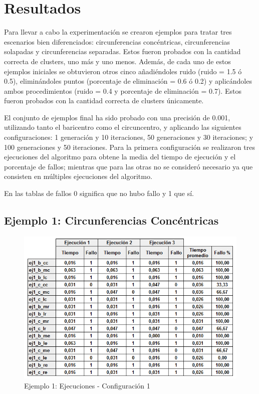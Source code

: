 \documentclass[conference,a4paper]{IEEEtran}
\begin{document}
\section{Resultados}

Para llevar a cabo la experimentación se crearon ejemplos para tratar tres escenarios bien diferenciados: circunferencias concéntricas, circunferencias solapadas y circunferencias separadas. Estos fueron probados con la cantidad correcta de clusters, uno más y uno menos. Además, de cada uno de estos ejemplos iniciales se obtuvieron otros cinco añadiéndoles ruido (ruido = 1.5 ó 0.5), eliminándoles puntos (porcentaje de eliminación = 0.6 ó 0.2) y aplicándoles ambos procedimientos (ruido = 0.4 y porcentaje de eliminación = 0.7). Estos fueron probados con la cantidad correcta de clusters únicamente.

El conjunto de ejemplos final ha sido probado con una precisión de 0.001, utilizando tanto el baricentro como el circuncentro, y aplicando las siguientes configuraciones: 1 generación y 10 iteraciones, 50 generaciones y 30 iteraciones; y 100 generaciones y 50 iteraciones. Para la primera configuración se realizaron tres ejecuciones del algoritmo para obtene la media del tiempo de ejecución y el porcentaje de fallos; mientras que para las otras no se consideró necesario ya que consisten en múltiples ejecuciones del algoritmo.

En las tablas de fallos 0 significa que no hubo fallo y 1 que sí.

\subsection{Ejemplo 1: Circunferencias Concéntricas}

\begin{figure}[H]
\centering
\includegraphics[scale=0.5]{Experimentacion/Ejemplo1/Ejemplo1Ejecuciones}
\caption{Ejemplo 1: Ejecuciones - Configuración 1}
\end{figure}
\end{document}
